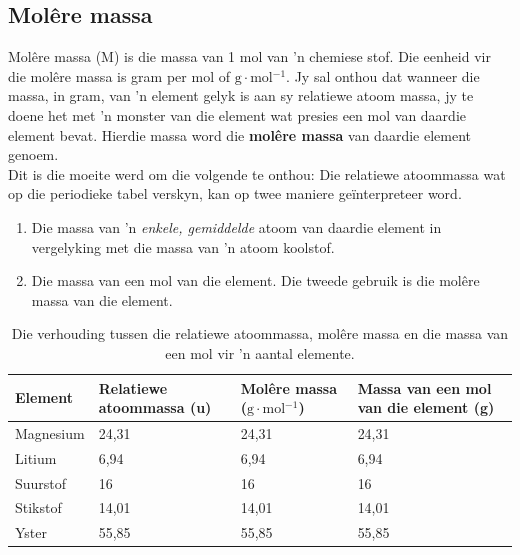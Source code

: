             \subsection*{Mol\^{e}re massa}
            \nopagebreak
{} { Mol\^{e}re massa (M) is die massa van 1 mol van  'n chemiese stof. Die eenheid vir die mol\^{e}re massa is gram per mol of $\text{g}\ensuremath{\cdot}\text{mol}{}^{-1}$. } 
Jy sal onthou dat wanneer die massa, in gram, van  'n element gelyk is aan sy relatiewe atoom massa, jy te doene het met   'n monster van die element wat presies een mol van daardie element bevat. Hierdie massa word die \textbf{mol\^{e}re massa} van daardie element genoem.\\
\label{m38717*id276445}Dit is die moeite werd om die volgende te onthou: Die relatiewe atoommassa wat op die periodieke tabel verskyn, kan op twee maniere geïnterpreteer word.
\begin{enumerate}[noitemsep, label=\textbf{\arabic*}. ] 
\item Die massa van  'n \textsl{enkele, gemiddelde} atoom van daardie element in vergelyking met die massa van 'n atoom koolstof.
\item Die massa van een mol van die element. Die tweede gebruik is die mol\^{e}re massa van die element.
\end{enumerate}
          \begin{table}[H]
        \begin{center}
      \label{m38717*uid11}
    \noindent
      \begin{tabular}{|l|l|l|p{3cm}|}\hline
                \textbf{Element}
               &
                \textbf{Relatiewe atoommassa (u)}
               &
                \textbf{Mol\^{e}re massa ($\text{g}\ensuremath{\cdot}\text{mol}{}^{-1}$)}
               &
                \textbf{Massa van een mol van die element (g)} \\ \hline
        Magnesium &
        24,31 &
        24,31 &
        24,31 \\ \hline
        Litium &
        6,94 &
        6,94 &
        6,94 \\ \hline
        Suurstof &
        16 &
        16 &
        16 \\ \hline
        Stikstof &
        14,01 &
        14,01 &
        14,01  \\ \hline
        Yster &
        55,85 &
        55,85 &
        55,85 \\ \hline
    \end{tabular}
      \end{center}
    \caption{Die verhouding tussen die relatiewe atoommassa, mol\^{e}re massa en die massa van een mol vir  'n aantal elemente.}
\end{table}



